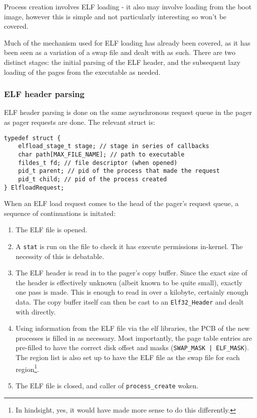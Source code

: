 \documentclass[12pt,english]{article}
\begin{document}
Process creation involves ELF loading - it also may involve loading from the boot image, however this is simple and not particularly interesting so won't be covered.

Much of the mechanism used for ELF loading has already been covered, as it has been seen as a variation of a swap file and dealt with as such.  There are two distinct stages: the initial parsing of the ELF header, and the subsequent lazy loading of the pages from the executable as needed.

\subsubsection{ELF header parsing}

ELF header parsing is done on the same asynchronous request queue in the pager as pager requests are done.  The relevant struct is:

\begin{verbatim}
typedef struct {
    elfload_stage_t stage; // stage in series of callbacks
    char path[MAX_FILE_NAME]; // path to executable
    fildes_t fd; // file descriptor (when opened)
    pid_t parent; // pid of the process that made the request
    pid_t child; // pid of the process created
} ElfloadRequest;
\end{verbatim}

When an ELF load request comes to the head of the pager's request queue, a sequence of continuations is initated:
\begin{enumerate}
\item The ELF file is opened.
\item A \texttt{stat} is run on the file to check it has execute permissions in-kernel.  The necessity of this is debatable.
\item The ELF header is read in to the pager's copy buffer.  Since the exact size of the header is effectively unknown (albeit known to be quite small), exactly one pass is made.  This is enough to read in over a kilobyte, certainly enough data.  The copy buffer itself can then be cast to an \texttt{Elf32\_Header} and dealt with directly.
\item Using information from the ELF file via the elf libraries, the PCB of the new processes is filled in as necessary.  Most importantly, the page table entries are pre-filled to have the correct disk offset and masks (\texttt{SWAP\_MASK | ELF\_MASK}).  The region list is also set up to have the ELF file as the swap file for each region\footnote{In hindsight, yes, it would have made more sense to do this differently.}.
\item The ELF file is closed, and caller of \texttt{process\_create} woken.
\end{enumerate}
\end{document}
